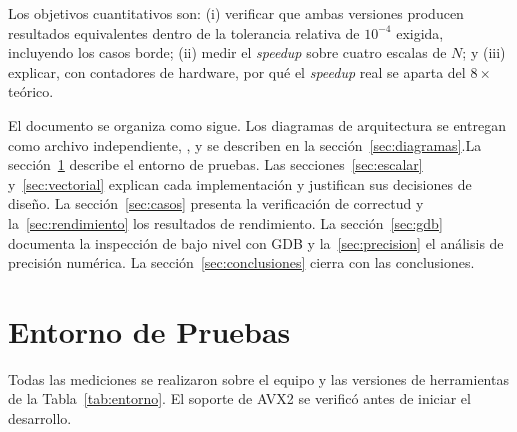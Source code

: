 \documentclass[journal]{IEEEtran}
\begin{document}
Los objetivos cuantitativos son: (i) verificar que ambas versiones
producen resultados equivalentes dentro de la tolerancia relativa de
$10^{-4}$ exigida, incluyendo los casos borde; (ii) medir el
\textit{speedup} sobre cuatro escalas de $N$; y (iii) explicar, con
contadores de hardware, por qué el \textit{speedup} real se aparta del
$8\times$ teórico.

El documento se organiza como sigue. Los diagramas de arquitectura se entregan como archivo independiente,
\archdiag, y se describen en la sección~\ref{sec:diagramas}.La sección~\ref{sec:entorno} describe el entorno de pruebas. Las secciones~\ref{sec:escalar} y~\ref{sec:vectorial} explican cada implementación y justifican sus
decisiones de diseño. La sección~\ref{sec:casos} presenta la
verificación de correctud y la~\ref{sec:rendimiento} los resultados de
rendimiento. La sección~\ref{sec:gdb} documenta la inspección de bajo
nivel con GDB y la~\ref{sec:precision} el análisis de precisión
numérica. La sección~\ref{sec:conclusiones} cierra con las
conclusiones. 

\section{Entorno de Pruebas}
\label{sec:entorno}

Todas las mediciones se realizaron sobre el equipo y las versiones de
herramientas de la Tabla~\ref{tab:entorno}. El soporte de AVX2 se
verificó antes de iniciar el desarrollo.
\end{document}
